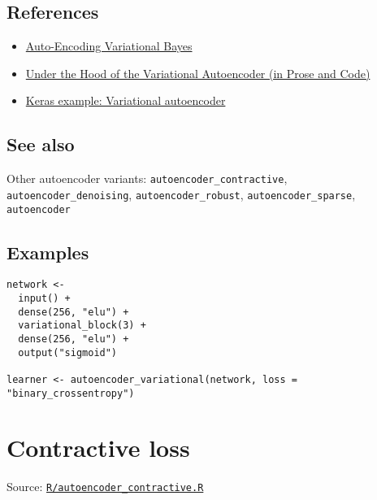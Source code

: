 \hypertarget{references}{\subsection{\texorpdfstring{\protect\hyperlink{references}{}References}{References}}\label{references}}

\begin{itemize}
\item
  \href{https://arxiv.org/abs/1312.6114}{Auto-Encoding Variational
  Bayes}
\item
  \href{http://blog.fastforwardlabs.com/2016/08/22/under-the-hood-of-the-variational-autoencoder-in.html}{Under
  the Hood of the Variational Autoencoder (in Prose and Code)}
\item
  \href{https://keras.rstudio.com/articles/examples/variational_autoencoder.html}{Keras
  example: Variational autoencoder}
\end{itemize}

\hypertarget{see-also}{\subsection{\texorpdfstring{\protect\hyperlink{see-also}{}See
also}{See also}}\label{see-also}}

Other autoencoder variants: \texttt{autoencoder\_contractive},
\texttt{autoencoder\_denoising}, \texttt{autoencoder\_robust},
\texttt{autoencoder\_sparse}, \texttt{autoencoder}

\hypertarget{examples}{\subsection{\texorpdfstring{\protect\hyperlink{examples}{}Examples}{Examples}}\label{examples}}

\begin{verbatim}
network <-
  input() +
  dense(256, "elu") +
  variational_block(3) +
  dense(256, "elu") +
  output("sigmoid")

learner <- autoencoder_variational(network, loss = "binary_crossentropy")
\end{verbatim}

\section{Contractive loss}\label{contractive-loss}

Source:
\href{https://github.com/fdavidcl/ruta/blob/master/R/autoencoder_contractive.R}{\texttt{R/autoencoder\_contractive.R}}

